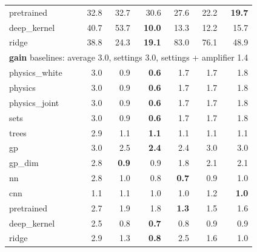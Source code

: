 \begin{tabular}{lrrrrrr}
pretrained & 32.8 & 32.7 & 30.6 & 27.6 & 22.2 & \textbf{19.7} \\
deep\_kernel & 40.7 & 53.7 & \textbf{10.0} & 13.3 & 12.2 & 15.7 \\
ridge & 38.8 & 24.3 & \textbf{19.1} & 83.0 & 76.1 & 48.9 \\
\midrule
\multicolumn{7}{l}{\textbf{gain} \quad baselines: average 3.0, settings 3.0, settings + amplifier 1.4} \\ \midrule
physics\_white & 3.0 & 0.9 & \textbf{0.6} & 1.7 & 1.7 & 1.8 \\
physics & 3.0 & 0.9 & \textbf{0.6} & 1.7 & 1.7 & 1.8 \\
physics\_joint & 3.0 & 0.9 & \textbf{0.6} & 1.7 & 1.7 & 1.8 \\
sets & 3.0 & 0.9 & \textbf{0.6} & 1.7 & 1.7 & 1.8 \\
trees & 2.9 & 1.1 & \textbf{1.1} & 1.1 & 1.1 & 1.1 \\
gp & 3.0 & 2.5 & \textbf{2.4} & 2.4 & 3.0 & 3.0 \\
gp\_dim & 2.8 & \textbf{0.9} & 0.9 & 1.8 & 2.1 & 2.1 \\
nn & 2.8 & 1.0 & 0.8 & \textbf{0.7} & 0.9 & 1.0 \\
cnn & 1.1 & 1.1 & 1.0 & 1.0 & 1.2 & \textbf{1.0} \\
pretrained & 2.7 & 1.9 & 1.8 & \textbf{1.3} & 1.5 & 1.6 \\
deep\_kernel & 2.5 & 0.8 & \textbf{0.7} & 0.8 & 0.9 & 0.9 \\
ridge & 2.9 & 1.3 & \textbf{0.8} & 2.5 & 1.6 & 1.0 \\
\bottomrule
\end{tabular}
